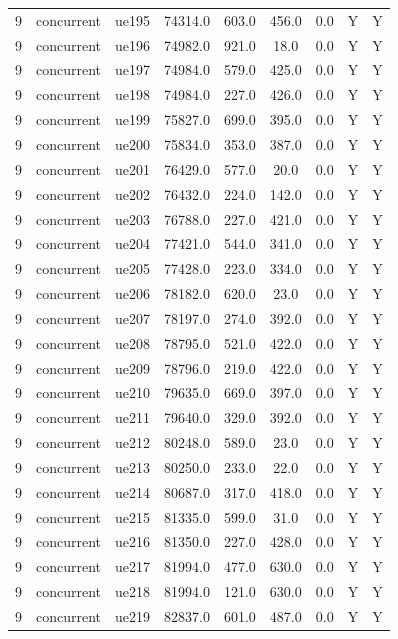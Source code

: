 \begin{table}[ht]
\begin{tabular}{|c|c|c|c|c|c|c|c|c|}
9 & concurrent & ue195 & 74314.0 & 603.0 & 456.0 & 0.0 & Y & Y \\
9 & concurrent & ue196 & 74982.0 & 921.0 & 18.0 & 0.0 & Y & Y \\
9 & concurrent & ue197 & 74984.0 & 579.0 & 425.0 & 0.0 & Y & Y \\
9 & concurrent & ue198 & 74984.0 & 227.0 & 426.0 & 0.0 & Y & Y \\
9 & concurrent & ue199 & 75827.0 & 699.0 & 395.0 & 0.0 & Y & Y \\
9 & concurrent & ue200 & 75834.0 & 353.0 & 387.0 & 0.0 & Y & Y \\
9 & concurrent & ue201 & 76429.0 & 577.0 & 20.0 & 0.0 & Y & Y \\
9 & concurrent & ue202 & 76432.0 & 224.0 & 142.0 & 0.0 & Y & Y \\
9 & concurrent & ue203 & 76788.0 & 227.0 & 421.0 & 0.0 & Y & Y \\
9 & concurrent & ue204 & 77421.0 & 544.0 & 341.0 & 0.0 & Y & Y \\
9 & concurrent & ue205 & 77428.0 & 223.0 & 334.0 & 0.0 & Y & Y \\
9 & concurrent & ue206 & 78182.0 & 620.0 & 23.0 & 0.0 & Y & Y \\
9 & concurrent & ue207 & 78197.0 & 274.0 & 392.0 & 0.0 & Y & Y \\
9 & concurrent & ue208 & 78795.0 & 521.0 & 422.0 & 0.0 & Y & Y \\
9 & concurrent & ue209 & 78796.0 & 219.0 & 422.0 & 0.0 & Y & Y \\
9 & concurrent & ue210 & 79635.0 & 669.0 & 397.0 & 0.0 & Y & Y \\
9 & concurrent & ue211 & 79640.0 & 329.0 & 392.0 & 0.0 & Y & Y \\
9 & concurrent & ue212 & 80248.0 & 589.0 & 23.0 & 0.0 & Y & Y \\
9 & concurrent & ue213 & 80250.0 & 233.0 & 22.0 & 0.0 & Y & Y \\
9 & concurrent & ue214 & 80687.0 & 317.0 & 418.0 & 0.0 & Y & Y \\
9 & concurrent & ue215 & 81335.0 & 599.0 & 31.0 & 0.0 & Y & Y \\
9 & concurrent & ue216 & 81350.0 & 227.0 & 428.0 & 0.0 & Y & Y \\
9 & concurrent & ue217 & 81994.0 & 477.0 & 630.0 & 0.0 & Y & Y \\
9 & concurrent & ue218 & 81994.0 & 121.0 & 630.0 & 0.0 & Y & Y \\
9 & concurrent & ue219 & 82837.0 & 601.0 & 487.0 & 0.0 & Y & Y \\

\end{tabular}
\end{table}
